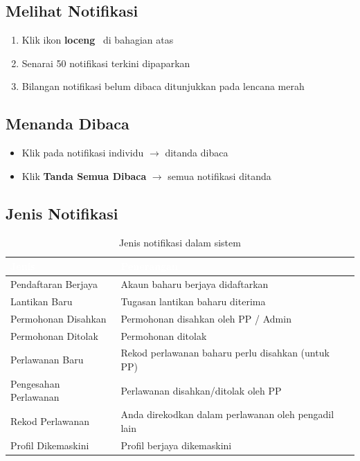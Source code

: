 \documentclass[12pt,a4paper]{report}
\newcommand{\btn}[1]{\colorbox{primaryblue!10}{\textcolor{primaryblue}{\textbf{#1}}}}
\begin{document}
\subsection{Melihat Notifikasi}
\begin{enumerate}[label=\textcolor{pbnpblue}{\textbf{\arabic*.}}, leftmargin=2em]
  \item Klik ikon \textbf{loceng} \faBell\ di bahagian atas
  \item Senarai 50 notifikasi terkini dipaparkan
  \item Bilangan notifikasi belum dibaca ditunjukkan pada lencana merah
\end{enumerate}

\subsection{Menanda Dibaca}
\begin{itemize}[label=\textcolor{pbnpblue}{\faChevronRight}]
  \item Klik pada notifikasi individu $\rightarrow$ ditanda dibaca
  \item Klik \btn{Tanda Semua Dibaca} $\rightarrow$ semua notifikasi ditanda
\end{itemize}

\subsection{Jenis Notifikasi}

\begin{table}[H]
\centering
{}
\begin{tabularx}{\textwidth}{l X}
\toprule
\rowcolor{tableheader}
\textcolor{white}{\textbf{Jenis}} & \textcolor{white}{\textbf{Penerangan}} \\
\midrule
Pendaftaran Berjaya & Akaun baharu berjaya didaftarkan \\
Lantikan Baru & Tugasan lantikan baharu diterima \\
Permohonan Disahkan & Permohonan disahkan oleh PP / Admin \\
Permohonan Ditolak & Permohonan ditolak \\
Perlawanan Baru & Rekod perlawanan baharu perlu disahkan (untuk PP) \\
Pengesahan Perlawanan & Perlawanan disahkan/ditolak oleh PP \\
Rekod Perlawanan & Anda direkodkan dalam perlawanan oleh pengadil lain \\
Profil Dikemaskini & Profil berjaya dikemaskini \\
\bottomrule
\end{tabularx}
\caption{Jenis notifikasi dalam sistem}
\end{table}
\end{document}
